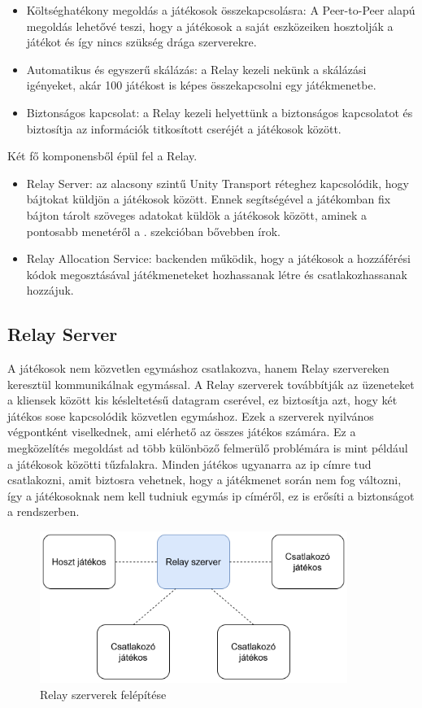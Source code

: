\documentclass[]{thesis-ekf}
\theoremstyle{definition}
\theoremstyle{remark}
\begin{document}
\begin{itemize}
	\item Költséghatékony megoldás a játékosok összekapcsolásra: A Peer-to-Peer alapú megoldás lehetővé teszi, hogy a játékosok a saját eszközeiken hosztolják a játékot és így nincs szükség drága szerverekre.
	\item Automatikus és egyszerű skálázás: a Relay kezeli nekünk a skálázási igényeket, akár 100 játékost is képes összekapcsolni egy játékmenetbe.
	\item Biztonságos kapcsolat: a Relay kezeli helyettünk a biztonságos kapcsolatot és biztosítja az információk titkosított cseréjét a játékosok között.
\end{itemize}

Két fő komponensből épül fel a Relay.

\begin{itemize}
	\item Relay Server: az alacsony szintű Unity Transport réteghez kapcsolódik, hogy bájtokat küldjön a játékosok között. Ennek segítségével a játékomban fix bájton tárolt szöveges adatokat küldök a játékosok között, aminek a pontosabb menetéről a . szekcióban bővebben írok.
	\item Relay Allocation Service: backenden működik, hogy a játékosok a hozzáférési kódok megosztásával játékmeneteket hozhassanak létre és csatlakozhassanak hozzájuk.
\end{itemize}

\subsection{Relay Server}
A játékosok nem közvetlen egymáshoz csatlakozva, hanem Relay szervereken keresztül kommunikálnak egymással. A Relay szerverek továbbítják az üzeneteket a kliensek között kis késleltetésű datagram cserével, ez biztosítja azt, hogy két játékos sose kapcsolódik közvetlen egymáshoz. Ezek a szerverek nyilvános végpontként viselkednek, ami elérhető az összes játékos számára. Ez a megközelítés megoldást ad több különböző felmerülő problémára is mint például a játékosok közötti tűzfalakra. Minden játékos ugyanarra az ip címre tud csatlakozni, amit biztosra vehetnek, hogy a játékmenet során nem fog változni, így a játékosoknak nem kell tudniuk egymás ip címéről, ez is erősíti a biztonságot a rendszerben. \cite{UnityRelayServers}

\begin{figure}[ht!]
	\centering
	\includegraphics[width=10cm]{RelayServer}
	\caption{Relay szerverek felépítése}
	\label{fig-unityrelayservers}
\end{figure}
\end{document}
